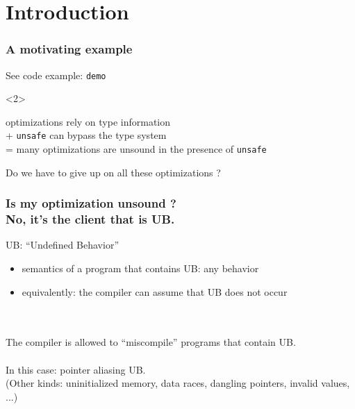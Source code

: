 \begin{frame}
    \titlepage
\end{frame}

\section{Introduction}


\begin{frame}[fragile,t]
    \frametitle{A motivating example}
    See code example: \texttt{demo}

    \begin{onlyenv}<2>
        \begin{block}{}
            optimizations rely on type information\\
            + \texttt{unsafe} can bypass the type system\\
            = many optimizations are unsound in the presence of \texttt{unsafe}
        \end{block}
        Do we have to give up on all these optimizations ?
    \end{onlyenv}
\end{frame}

\begin{frame}
    \frametitle{Is my optimization unsound ?\\No, it's the client that is UB.}
    UB: ``Undefined Behavior''
    \begin{itemize}
        \item semantics of a program that contains UB: any behavior
        \item equivalently: the compiler can assume that UB does not occur
    \end{itemize}~\\~\\

    The compiler is allowed to ``miscompile'' programs that contain UB.~\\~\\

    In this case: pointer aliasing UB.\\
    (Other kinds: uninitialized memory, data races, dangling pointers, invalid values, ...)
\end{frame}

